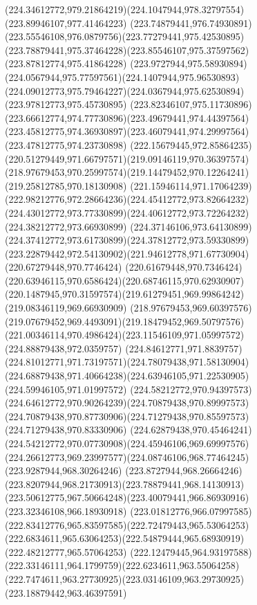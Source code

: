 {{		\curveto(224.34612772,979.21864219)(224.1047944,978.32797554)(223.89946107,977.41464223)
		\curveto(223.74879441,976.74930891)(223.55546108,976.0879756)(223.77279441,975.42530895)
		\curveto(223.78879441,975.37464228)(223.85546107,975.37597562)(223.87812774,975.41864228)
		\curveto(223.9727944,975.58930894)(224.0567944,975.77597561)(224.1407944,975.96530893)
		\curveto(224.09012773,975.79464227)(224.0367944,975.62530894)(223.97812773,975.45730895)
		\curveto(223.82346107,975.11730896)(223.66612774,974.77730896)(223.49679441,974.44397564)
		\curveto(223.45812775,974.36930897)(223.46079441,974.29997564)(223.47812775,974.23730898)
		\curveto(222.15679445,972.85864235)(220.51279449,971.66797571)(219.09146119,970.36397574)
		\curveto(218.97679453,970.25997574)(219.14479452,970.12264241)(219.25812785,970.18130908)
		\curveto(221.15946114,971.17064239)(222.98212776,972.28664236)(224.45412772,973.82664232)
		\curveto(224.43012772,973.77330899)(224.40612772,973.72264232)(224.38212772,973.66930899)
		\curveto(224.37146106,973.64130899)(224.37412772,973.61730899)(224.37812772,973.59330899)
		\curveto(223.22879442,972.54130902)(221.94612778,971.67730904)(220.67279448,970.7746424)
		\curveto(220.61679448,970.7346424)(220.63946115,970.6586424)(220.68746115,970.62930907)
		\curveto(220.1487945,970.31597574)(219.61279451,969.99864242)(219.08346119,969.66930909)
		\curveto(218.97679453,969.60397576)(219.07679452,969.4493091)(219.18479452,969.50797576)
		\curveto(221.00346114,970.4986424)(223.11546109,971.05997572)(224.88879438,972.0359757)
		\curveto(224.84612771,971.8839757)(224.81012771,971.73197571)(224.78079438,971.58130904)
		\curveto(224.68879438,971.40664238)(224.63946105,971.22530905)(224.59946105,971.01997572)
		\curveto(224.58212772,970.94397573)(224.64612772,970.90264239)(224.70879438,970.89997573)
		\curveto(224.70879438,970.87730906)(224.71279438,970.85597573)(224.71279438,970.83330906)
		\curveto(224.62879438,970.45464241)(224.54212772,970.07730908)(224.45946106,969.69997576)
		\curveto(224.26612773,969.23997577)(224.08746106,968.77464245)(223.9287944,968.30264246)
		\curveto(223.8727944,968.26664246)(223.8207944,968.21730913)(223.78879441,968.14130913)
		\curveto(223.50612775,967.50664248)(223.40079441,966.86930916)(223.32346108,966.18930918)
		\curveto(223.01812776,966.07997585)(222.83412776,965.83597585)(222.72479443,965.53064253)
		\curveto(222.6834611,965.63064253)(222.54879444,965.68930919)(222.48212777,965.57064253)
		\curveto(222.12479445,964.93197588)(222.33146111,964.1799759)(222.6234611,963.55064258)
		\curveto(222.7474611,963.27730925)(223.03146109,963.29730925)(223.18879442,963.46397591)
}}
